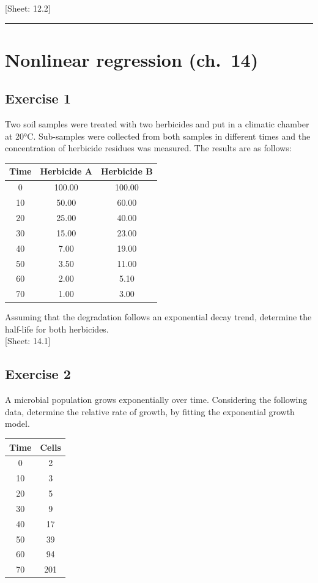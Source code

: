 \documentclass[a4paper,12pt,oneside]{book}
\begin{document}
{[}Sheet: 12.2{]}

\begin{center}\rule{0.5\linewidth}{0.5pt}\end{center}

\hypertarget{nonlinear-regression-ch.-14}{%
\section{Nonlinear regression (ch.~14)}\label{nonlinear-regression-ch.-14}}

\hypertarget{exercise-1-9}{%
\subsection{Exercise 1}\label{exercise-1-9}}

Two soil samples were treated with two herbicides and put in a climatic chamber at 20°C. Sub-samples were collected from both samples in different times and the concentration of herbicide residues was measured. The results are as follows:

\begin{longtable}[]{@{}ccc@{}}
\toprule()
Time & Herbicide A & Herbicide B \\
\midrule()
\endhead
0 & 100.00 & 100.00 \\
10 & 50.00 & 60.00 \\
20 & 25.00 & 40.00 \\
30 & 15.00 & 23.00 \\
40 & 7.00 & 19.00 \\
50 & 3.50 & 11.00 \\
60 & 2.00 & 5.10 \\
70 & 1.00 & 3.00 \\
\bottomrule()
\end{longtable}

Assuming that the degradation follows an exponential decay trend, determine the half-life for both herbicides.\\
{[}Sheet: 14.1{]}

\hypertarget{exercise-2-9}{%
\subsection{Exercise 2}\label{exercise-2-9}}

A microbial population grows exponentially over time. Considering the following data, determine the relative rate of growth, by fitting the exponential growth model.

\begin{longtable}[]{@{}cc@{}}
\toprule()
Time & Cells \\
\midrule()
\endhead
0 & 2 \\
10 & 3 \\
20 & 5 \\
30 & 9 \\
40 & 17 \\
50 & 39 \\
60 & 94 \\
70 & 201 \\
\bottomrule()
\end{longtable}
\end{document}
